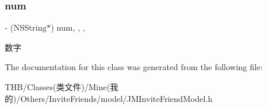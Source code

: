 \subsubsection{\texorpdfstring{num}{num}}
{\footnotesize\ttfamily -\/ (N\+S\+String$\ast$) num\hspace{0.3cm}{\ttfamily [read]}, {\ttfamily [write]}, {\ttfamily [nonatomic]}, {\ttfamily [copy]}}

数字 

The documentation for this class was generated from the following file\+:\begin{DoxyCompactItemize}
\item 
T\+H\+B/\+Classes(类文件)/\+Mine(我的)/\+Others/\+Invite\+Friends/model/J\+M\+Invite\+Friend\+Model.\+h\end{DoxyCompactItemize}
